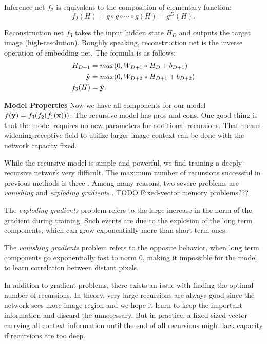 \documentclass[10pt,twocolumn,letterpaper]{article}
\begin{document}
Inference net $f_2$ is equivalent to the composition of elementary function: 
\begin{equation}
f_2(H) = g \circ g \circ \cdots \circ g(H) =  g^{D}(H).
\end{equation}

Reconstruction net $f_3$ takes the input hidden state $H_D$ and outputs the target image (high-resolution). Roughly speaking, reconstruction net is the inverse operation of embedding net. The formula is as follows:
\begin{align}
	H_{D+1} &= max(0, W_{D+1}*H_D + b_{D+1})\\
	\hat{{\bf y}} &= max(0, W_{D+2}*H_{D+1} + b_{D+2})\\
	f_3(H) &= \hat{{\bf y}}.
\end{align}

\textbf{Model Properties} Now we have all components for our model $f({\bf y}) = f_3(f_2 (f_1({\bf x})))$. The recursive model has pros and cons. One good thing is that the model requires no new parameters for additional recursions. That means widening receptive field to utilize larger image context can be done with the network capacity fixed. 

While the recursive model is simple and powerful, we find training a deeply-recursive network very difficult. The maximum number of recursions successful in previous methods is three \cite{Liang_2015_CVPR}.  Among many reasons, two severe problems are \textit{vanishing} and \textit{exploding gradients} \cite{bengio1994learning, pascanu2013difficulty}.   TODO Fixed-vector memory problems???

The \textit{exploding gradients} problem refers to the large increase in the norm
of the gradient during training. Such events are due to
the explosion of the long term components, which can grow exponentially more than short term ones.  


The
\textit{vanishing gradients} problem refers to the opposite behavior,
when long term components go exponentially
fast to norm 0, making it impossible for the model to
learn correlation between distant pixels.

In addition to gradient problems, there exists an issue with finding the optimal number of recursions. In theory, very large recursions are always good since the network sees more image region and we hope it learn to keep the important information and discard the unnecessary.  But in practice, a fixed-sized vector carrying all context information until the end of all recursions might lack capacity if recursions are too deep. 
\end{document}
